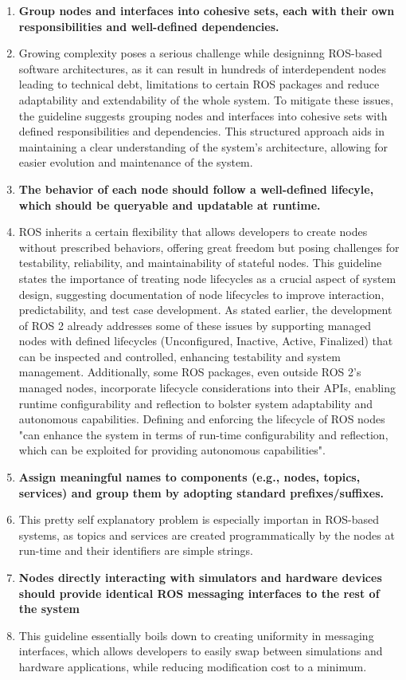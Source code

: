 \documentclass[]{article}
\begin{document}
\begin{enumerate}[leftmargin=9mm, align=left]
		\item \textbf{Group nodes and interfaces into cohesive sets, each with their own responsibilities and well-defined dependencies.} 
		\item[]Growing complexity poses a serious challenge while designinng ROS-based software architectures, as it can result in hundreds of interdependent nodes leading to technical debt, limitations to certain ROS packages and reduce adaptability and extendability of the whole system. To mitigate these issues, the guideline suggests grouping nodes and interfaces into cohesive sets with defined responsibilities and dependencies. This structured approach aids in maintaining a clear understanding of the system's architecture, allowing for easier evolution and maintenance of the system. \autocite{malavoltaHowYouArchitect2020}
		\item \textbf{The behavior of each node should follow a well-defined lifecyle, which should be queryable and updatable at runtime.} 
		\item[]ROS inherits a certain flexibility that allows developers to create nodes without prescribed behaviors, offering great freedom but posing challenges for testability, reliability, and maintainability of stateful nodes. This guideline states the importance of treating node lifecycles as a crucial aspect of system design, suggesting documentation of node lifecycles to improve interaction, predictability, and test case development. As stated earlier, the development of ROS 2 already addresses some of these issues by supporting managed nodes with defined lifecycles (Unconfigured, Inactive, Active, Finalized) that can be inspected and controlled, enhancing testability and system management. Additionally, some ROS packages, even outside ROS 2's managed nodes, incorporate lifecycle considerations into their APIs, enabling runtime configurability and reflection to bolster system adaptability and autonomous capabilities. \autocite{malavoltaHowYouArchitect2020}  Defining and enforcing the lifecycle of ROS nodes "can enhance the system in terms of run-time configurability and reflection, which can be exploited for providing autonomous capabilities". \autocite{malavoltaHowYouArchitect2020}
		\item  \textbf{Assign meaningful names to components (e.g., nodes, topics, services) and group them by adopting standard prefixes/suffixes.} 
		\item[] This pretty self explanatory problem is especially importan in ROS-based systems, as topics and services are created programmatically by the nodes at run-time and their identifiers are simple strings. \autocite{malavoltaHowYouArchitect2020}
		\item  \textbf{Nodes directly interacting with simulators and hardware devices should provide identical ROS messaging interfaces to the rest of the system} 
		\item[] This guideline essentially boils down to creating uniformity in messaging interfaces, which allows developers to easily swap between simulations and hardware applications, while reducing modification cost to a minimum. \autocite{malavoltaHowYouArchitect2020}
		

\end{enumerate}
\end{document}
